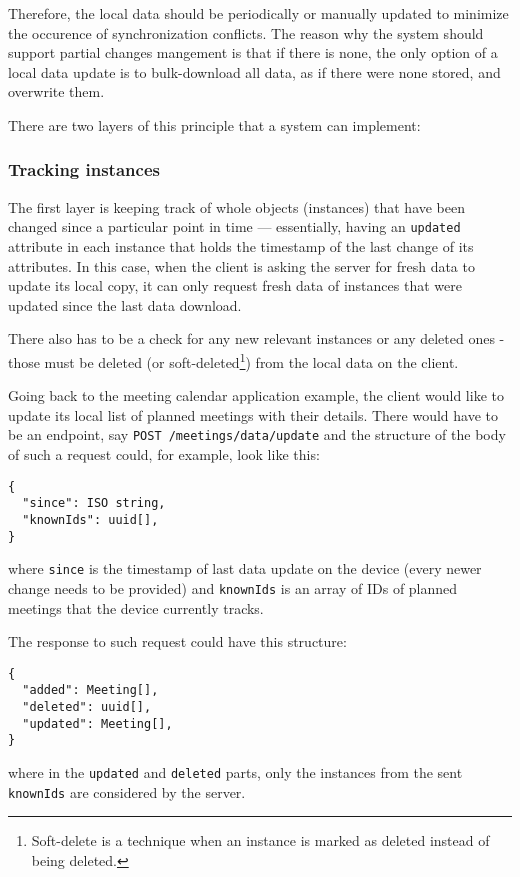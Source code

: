 \documentclass[
  digital,     %
  color,       %
  oneside,     %
  nosansbold,  %
  nocolorbold, %
  lof,         %
  lot,         %
]{fithesis4}
\begin{document}
Therefore, the local data should be periodically or manually updated to minimize the occurence of synchronization conflicts. The reason why the system should support partial changes mangement is that if there is none, the only option of a local data update is to bulk-download all data, as if there were none stored, and overwrite them. 

There are two layers of this principle that a system can implement:

\subsubsection{Tracking instances} 
The first layer is keeping track of whole objects (instances) that have been changed since a particular point in time --- essentially, having an \texttt{updated} attribute in each instance that holds the timestamp of the last change of its attributes. In this case, when the client is asking the server for fresh data to update its local copy, it can only request fresh data of instances that were updated since the last data download. 

There also has to be a check for any new relevant instances or any deleted ones - those must be deleted (or soft-deleted\footnote{Soft-delete is a technique when an instance is marked as deleted instead of being deleted.}) from the local data on the client.

Going back to the meeting calendar application example, the client would like to update its local list of planned meetings with their details. There would have to be an endpoint, say \texttt{POST /meetings/data/update} and the structure of the body of such a request could, for example, look like this: 

\begin{lstlisting}
{
  "since": ISO string,
  "knownIds": uuid[],
}

\end{lstlisting}
where \texttt{since} is the timestamp of last data update on the device (every newer change needs to be provided) and \texttt{knownIds} is an array of IDs of planned meetings that the device currently tracks.

The response to such request could have this structure:
\begin{lstlisting}
{
  "added": Meeting[],
  "deleted": uuid[],
  "updated": Meeting[],
}

\end{lstlisting}

where in the \texttt{updated} and \texttt{deleted} parts, only the instances from the sent \texttt{knownIds} are considered by the server.
\end{document}
